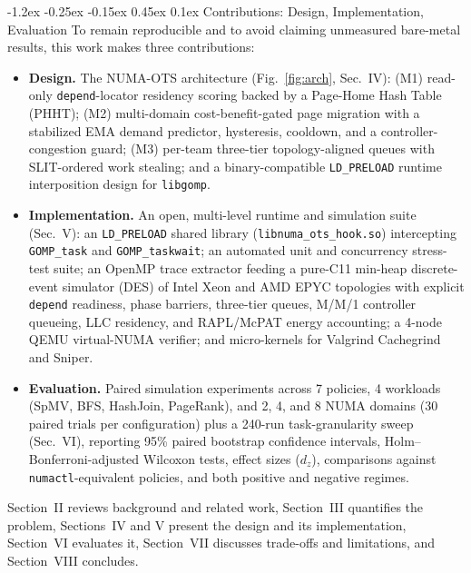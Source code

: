 \documentclass[10pt,twocolumn,letterpaper]{article}
\makeatletter
\renewcommand{\subsection}{\@startsection{subsection}{2}{\z@}%
  {-1.2ex \@plus -0.25ex \@minus -0.15ex}%
  {0.45ex \@plus 0.1ex}%
  {\normalfont\small\itshape}}
\makeatother
\begin{document}
\subsection{Contributions: Design, Implementation, Evaluation}
To remain reproducible and to avoid claiming unmeasured bare-metal results, this work makes three contributions:
\begin{itemize}\setlength{\itemsep}{1pt}\setlength{\parskip}{0pt}\setlength{\topsep}{2pt}
\item \textbf{Design.} The NUMA-OTS architecture (Fig.~\ref{fig:arch}, Sec.~IV): (M1) read-only \texttt{depend}-locator residency scoring backed by a Page-Home Hash Table (PHHT); (M2) multi-domain cost-benefit-gated page migration with a stabilized EMA demand predictor, hysteresis, cooldown, and a controller-congestion guard; (M3) per-team three-tier topology-aligned queues with SLIT-ordered work stealing; and a binary-compatible \texttt{LD\_PRELOAD} runtime interposition design for \texttt{libgomp}.
\item \textbf{Implementation.} An open, multi-level runtime and simulation suite (Sec.~V): an \texttt{LD\_PRELOAD} shared library (\texttt{libnuma\_ots\_hook.so}) intercepting \texttt{GOMP\_task} and \texttt{GOMP\_taskwait}; an automated unit and concurrency stress-test suite; an OpenMP trace extractor feeding a pure-C11 min-heap discrete-event simulator (DES) of Intel Xeon and AMD EPYC topologies with explicit \texttt{depend} readiness, phase barriers, three-tier queues, M/M/1 controller queueing, LLC residency, and RAPL/McPAT energy accounting; a 4-node QEMU virtual-NUMA verifier; and micro-kernels for Valgrind Cachegrind and Sniper.
\item \textbf{Evaluation.} Paired simulation experiments across 7 policies, 4 workloads (SpMV, BFS, HashJoin, PageRank), and 2, 4, and 8 NUMA domains (30 paired trials per configuration) plus a 240-run task-granularity sweep (Sec.~VI), reporting 95\% paired bootstrap confidence intervals, Holm--Bonferroni-adjusted Wilcoxon tests, effect sizes ($d_z$), comparisons against \texttt{numactl}-equivalent policies, and both positive and negative regimes.
\end{itemize}
Section~II reviews background and related work, Section~III quantifies the problem, Sections~IV and V present the design and its implementation, Section~VI evaluates it, Section~VII discusses trade-offs and limitations, and Section~VIII concludes.

\end{document}
